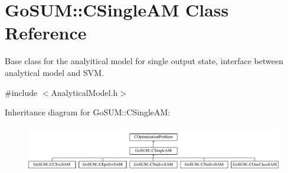 \hypertarget{class_go_s_u_m_1_1_c_single_a_m}{\section{Go\-S\-U\-M\-:\-:C\-Single\-A\-M Class Reference}
\label{class_go_s_u_m_1_1_c_single_a_m}
}


Base class for the analyitical model for single output state, interface between analytical model and S\-V\-M.  




{\ttfamily \#include $<$Analytical\-Model.\-h$>$}

Inheritance diagram for Go\-S\-U\-M\-:\-:C\-Single\-A\-M\-:\begin{figure}[H]
\begin{center}
\leavevmode
\includegraphics[height=2.086957cm]{class_go_s_u_m_1_1_c_single_a_m}
\end{center}
\end{figure}

